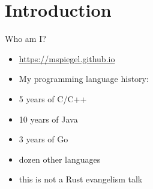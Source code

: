 \section{Introduction}


\begin{frame}[c]{Who am I?}
	\begin{itemize}
		\item \url{https://mspiegel.github.io}
		\item My programming language history:
		\item 5 years of C/C++
		\item 10 years of Java
		\item 3 years of Go
		\item \textonehalf{} dozen other languages
		\item this is not a Rust evangelism talk
	\end{itemize}
\end{frame}

